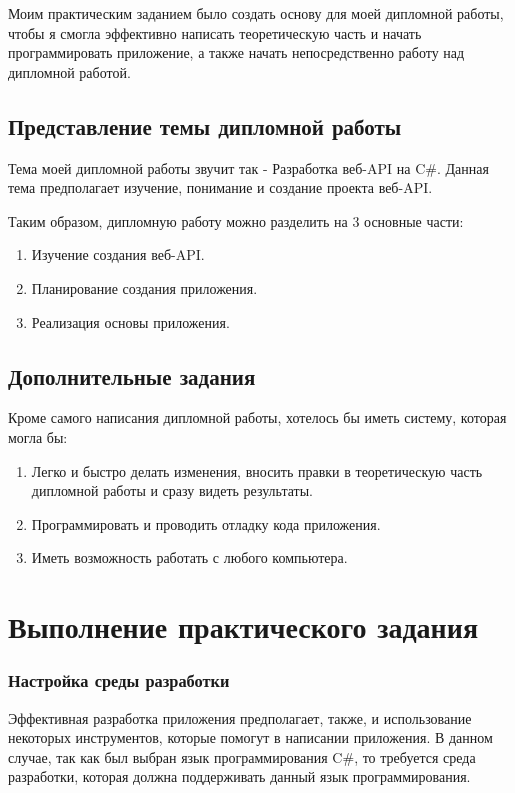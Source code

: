 \documentclass[a4paper,12pt]{report}
\begin{document}
Моим практическим заданием было создать основу для моей дипломной работы, чтобы я смогла эффективно написать теоретическую часть и начать 
программировать приложение, а также начать непосредственно работу над дипломной работой.


\section{Представление темы дипломной работы}

Тема моей дипломной работы звучит так - Разработка веб-\acs{API} на C\#.
Данная тема предполагает изучение, понимание и создание проекта веб-\acs{API}.

Таким образом, дипломную работу можно разделить на 3 основные части:
\begin{enumerate}
  \item Изучение создания веб-\acs{API}.
  \item Планирование создания приложения.
  \item Реализация основы приложения.
\end{enumerate}

\section{Дополнительные задания}

Кроме самого написания дипломной работы, хотелось бы иметь систему, которая могла бы:
\begin{enumerate}
  \item Легко и быстро делать изменения, вносить правки в теоретическую часть дипломной работы и сразу видеть результаты.
  \item Программировать и проводить отладку кода приложения.
  \item Иметь возможность работать с любого компьютера.
\end{enumerate}

\chapter{Выполнение практического задания}

\subsection{Настройка среды разработки}

Эффективная разработка приложения предполагает, также, и использование некоторых инструментов, которые помогут в написании приложения.
В данном случае, так как был выбран язык программирования C\#, то требуется среда разработки, которая должна поддерживать данный язык программирования.
\end{document}
